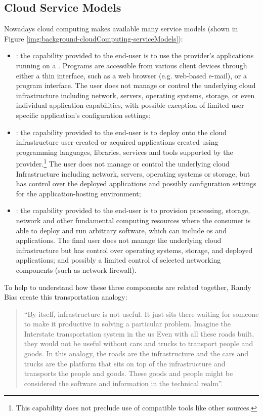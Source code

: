 \subsection{Cloud Service Models}
\label{sec:background-cloudComputing-cloudServiceModels}
Nowadays cloud computing makes available many service models (shown in Figure
\ref{img:background-cloudComputing-serviceModels}):

\begin{itemize}
	\item{: the capability provided to the end-user is to use the provider's
		applications running on a . Programs are accessible from various
		client devices through either a thin interface, such as a web browser (e.g. web-based e-mail),
		or a program interface. The user does not manage or control the underlying cloud infrastructure
		including network, servers, operating systems, storage, or even individual application capabilities,
		with possible exception of limited user specific application's configuration settings;}
	\item{: the capability provided to the end-user is to deploy onto the cloud
		infrastructure user-created or acquired applications created using programming languages,
		libraries, services and tools supported by the provider.\footnote{This capability does not preclude
		use of compatible tools like other sources.} The user does not manage or control the underlying
		cloud Infrastructure including network, servers, operating systems or storage, but has control
		over the deployed applications and possibly configuration settings for the application-hosting
		environment;}
	\item{: the capability provided to the end-user is to provision processing, storage,
		network and other fundamental computing resources where the consumer is able to deploy and run
		arbitrary software, which can include \acs{os} and applications. The final user does not
		manage the underlying cloud infrastructure but has control over operating systems, storage, and
		deployed applications; and possibly a limited control of selected networking components (such as
		network firewall).}
\end{itemize}

To help to understand how these three components are related together, Randy Bias \cite{differenceIaasPaas}
create this transportation analogy:

\begin{quote}
	``By itself, infrastructure is not useful. It just sits there waiting for someone to make it productive in
	solving a particular problem. Imagine the Interstate transportation system in the \acs{us} Even with all
	these roads built, they would not be useful without cars and trucks to transport people and goods. In this
	analogy, the roads are the infrastructure and the cars and trucks are the platform that sits on top of the
	infrastructure and transports the people and goods. These goods and people might be considered the software
	and information in the technical realm''.
\end{quote}


